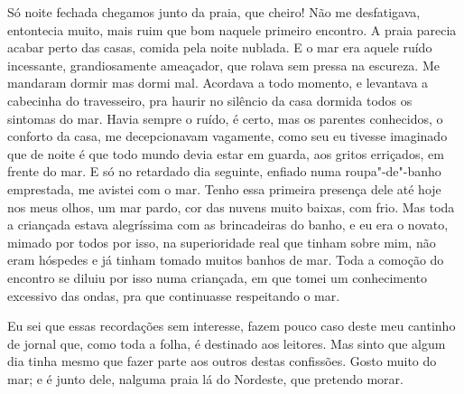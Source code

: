 Só noite fechada chegamos junto da praia, que cheiro! Não me
desfatigava, entontecia muito, mais ruim que bom naquele primeiro
encontro. A praia parecia acabar perto das casas, comida pela noite
nublada. E o mar era aquele ruído incessante, grandiosamente ameaçador,
que rolava sem pressa na escureza. Me mandaram dormir mas dormi mal.
Acordava a todo momento, e levantava a cabecinha do travesseiro, pra
haurir no silêncio da casa dormida todos os sintomas do mar. Havia
sempre o ruído, é certo, mas os parentes conhecidos, o conforto da casa,
me decepcionavam vagamente, como seu eu tivesse imaginado que de noite é
que todo mundo devia estar em guarda, aos gritos erriçados, em frente do
mar. E só no retardado dia seguinte, enfiado numa roupa"-de"-banho
emprestada, me avistei com o mar. Tenho essa primeira presença dele até
hoje nos meus olhos, um mar pardo, cor das nuvens muito baixas, com
frio. Mas toda a criançada estava alegríssima com as brincadeiras do
banho, e eu era o novato, mimado por todos por isso, na superioridade
real que tinham sobre mim, não eram hóspedes e já tinham tomado muitos
banhos de mar. Toda a comoção do encontro se diluiu por isso numa
criançada, em que tomei um conhecimento excessivo das ondas, pra que
continuasse respeitando o mar.

Eu sei que essas recordações sem interesse, fazem pouco caso deste meu
cantinho de jornal que, como toda a folha, é destinado aos leitores. Mas
sinto que algum dia tinha mesmo que fazer parte aos outros destas
confissões. Gosto muito do mar; e é junto dele, nalguma praia lá do
Nordeste, que pretendo morar.

